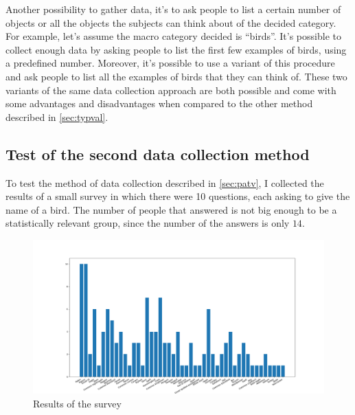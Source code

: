 \documentclass[conference]{IEEEtran}
\begin{document}
			\noindent Another possibility to gather data, it's to ask people to list a certain number of objects or all the objects the subjects can think about of the decided category. For example, let's assume the macro category decided 
			is ``birds''. It's possible to collect enough data by asking people to list the first few examples of birds, using a predefined number. Moreover, it's possible to use a variant of this procedure and ask people 
			to list all the examples of birds that they can think of. These two variants of the same data collection approach are both possible and come with some advantages and disadvantages when compared to the other 
			method described in \ref{sec:typval}. 
			
		\subsection{Test of the second data collection method}
	
		\noindent To test the method of data collection described in \ref{sec:patv}, I collected the results of a small survey in which there were 10 questions, each asking to give the name of a bird. The number of 
		people that answered is not big enough to be a statistically relevant group, since the number of the answers is only $14$.
	
		\begin{figure}
			\centerline{\includegraphics[width=\linewidth]{imgs/survey_hist.png}}
			\caption{Results of the survey}
			\label{fig:7}
		\end{figure}
		
\end{document}
